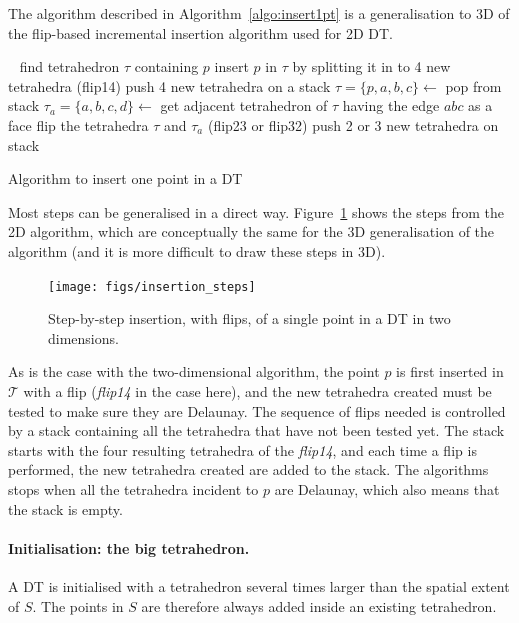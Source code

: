 The algorithm described in Algorithm~\ref{algo:insert1pt} is a generalisation to 3D of the flip-based incremental insertion algorithm used for 2D DT\@.
\begin{algorithm}[tb] 
  \DontPrintSemicolon\
  \KwOut{$\mathcal{T}^{p} = \mathcal{T} \cup \{p\}$}
  find tetrahedron $\tau$ containing $p$\;
  insert $p$ in $\tau$ by splitting it in to 4 new tetrahedra (flip14)\;
  push 4 new tetrahedra on a stack\;
  {
    $\tau = \{p,a,b,c\} \leftarrow$ pop from stack\;
    $\tau_{a} = \{a,b,c,d\} \leftarrow$ get adjacent tetrahedron of $\tau$ having the edge $abc$ as a face\;
    \If{$d$ is inside circumsphere of $\tau$}
    {
      {
        flip the tetrahedra $\tau$ and $\tau_{a}$ (flip23 or flip32)\;
        push 2 or 3 new tetrahedra on stack\;
      }
    }
  }
  \caption{Algorithm to insert one point in a DT}%
\label{algo:insert1pt}
\end{algorithm} 

Most steps can be generalised in a direct way.
Figure~\ref{fig:insertion_steps} shows the steps from the 2D algorithm, which are conceptually the same for the 3D generalisation of the algorithm (and it is more difficult to draw these steps in 3D).
\begin{figure}
  \centering
  \texttt{[image: figs/insertion\_steps]}
  \caption[Step-by-step insertion of a single point in a DT in two dimensions]{Step-by-step insertion, with flips, of a single point in a DT in two dimensions.}%
\label{fig:insertion_steps}
\end{figure}




As is the case with the two-dimensional algorithm, the point $p$ is first inserted in $\mathcal{T}$ with a flip (\emph{flip14} in the case here), 
\marginnote{flips}\index{flip14}
and the new tetrahedra created must be tested to make sure they are Delaunay. 
The sequence of flips needed is controlled by a stack containing all the tetrahedra that have not been tested yet. 
The stack starts with the four resulting tetrahedra of the \emph{flip14}, and each time a flip is performed, the new tetrahedra created are added to the stack. 
The algorithms stops when all the tetrahedra incident to $p$ are Delaunay, which also means that the stack is empty.


\paragraph{Initialisation: the big tetrahedron.}
A DT is initialised with a tetrahedron several times larger than the spatial extent of $S$.
The points in $S$ are therefore always added inside an existing tetrahedron. 

